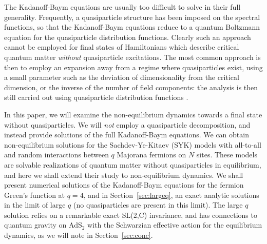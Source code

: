 \documentclass[prx,aps,onecolumn,amsfonts,showpacs,superscriptaddress,preprint,eqsecnum]
{revtex4-1}
\begin{document}
The Kadanoff-Baym equations are usually too difficult to solve in their full generality.
Frequently, a quasiparticle structure has been imposed on the spectral functions, so that the Kadanoff-Baym
equations reduce to a quantum Boltzmann equation for the quasiparticle distribution functions. 
Clearly such an approach cannot be employed for final states of Hamiltonians which describe
critical quantum matter {\em without\/} quasiparticle excitations. 
The most common approach is then to employ an expansion away from a regime where quasiparticles 
exist, using a small parameter such as the deviation of dimensionality from the critical dimension,
or the inverse of the number of field components: the analysis is then still carried out using
quasiparticle distribution functions \cite{DS97,Sachdev97}.


In this paper, we will examine the non-equilibrium dynamics towards a final state without quasiparticles.
We will {\em not\/} employ a quasiparticle decomposition, and instead provide solutions of the full Kadanoff-Baym
equations.
We can obtain non-equilibrium solutions for the Sachdev-Ye-Kitaev (SYK) 
models \cite{sy,kitaev2015talk,Maldacena2016} with all-to-all and random 
interactions between $q$ Majorana fermions on $N$ sites. These models are solvable realizations of quantum matter
without quasiparticles in equilibrium, and here we shall extend their study to non-equilibrium dynamics.
We shall present numerical solutions of the Kadanoff-Baym equations for the fermion Green's function at $q=4$, and in Section~\ref{sec:largeq}, an exact analytic
solutions in the limit of large $q$ (no quasiparticles are present in this limit). The large $q$ solution relies on a remarkable exact SL(2,C)
invariance, and has connections to quantum gravity on AdS$_2$ with the Schwarzian effective action \cite{SS10,SS10b,AAJP15,kitaev2015talk,Maldacena2016,KJ16,HV16} for the equilibrium dynamics, as we will note in Section~\ref{sec:conc}.
\end{document}

